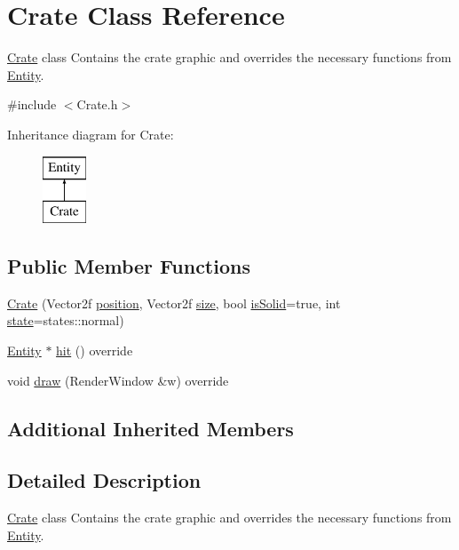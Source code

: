 \hypertarget{class_crate}{}\section{Crate Class Reference}
\label{class_crate}


\hyperlink{class_crate}{Crate} class Contains the crate graphic and overrides the necessary functions from \hyperlink{class_entity}{Entity}.  




{\ttfamily \#include $<$Crate.\+h$>$}

Inheritance diagram for Crate\+:\begin{figure}[H]
\begin{center}
\leavevmode
\includegraphics[height=2.000000cm]{class_crate}
\end{center}
\end{figure}
\subsection*{Public Member Functions}
\begin{DoxyCompactItemize}
\item 
\hyperlink{class_crate_aafcc7d0b42c7b58c3cb8afcb7d72d270}{Crate} (Vector2f \hyperlink{class_entity_a6af9d6498134ad0906011778bc5736db}{position}, Vector2f \hyperlink{class_entity_ae9a0a364c85f91ade5088b3610131417}{size}, bool \hyperlink{class_entity_af1b0754c9d5f4afa73834b23c6437101}{is\+Solid}=true, int \hyperlink{class_entity_a4edd9cc2506add0d9e27fade0bf957e8}{state}=states\+::normal)
\item 
\hyperlink{class_entity}{Entity} $\ast$ \hyperlink{class_crate_a6e4a24b12c92e8576c107b60f0b8f1a8}{hit} () override
\item 
void \hyperlink{class_crate_a2e9e544f1286c7de8830a8c2e7a955e9}{draw} (Render\+Window \&w) override
\end{DoxyCompactItemize}
\subsection*{Additional Inherited Members}


\subsection{Detailed Description}
\hyperlink{class_crate}{Crate} class Contains the crate graphic and overrides the necessary functions from \hyperlink{class_entity}{Entity}. 

